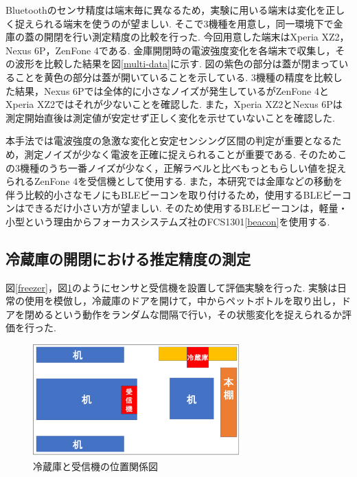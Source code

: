 \documentclass[Japanese]{dicomopapers}
\begin{document}
Bluetoothのセンサ精度は端末毎に異なるため，実験に用いる端末は変化を正しく捉えられる端末を使うのが望ましい.
そこで3機種を用意し，同一環境下で金庫の蓋の開閉を行い測定精度の比較を行った.
今回用意した端末はXperia XZ2，Nexus 6P，ZenFone 4である.
金庫開閉時の電波強度変化を各端末で収集し，その波形を比較した結果を図\ref{multi-data}に示す.
図の紫色の部分は蓋が閉まっていることを黄色の部分は蓋が開いていることを示している.
3機種の精度を比較した結果，Nexus 6Pでは全体的に小さなノイズが発生しているがZenFone 4とXperia XZ2ではそれが少ないことを確認した.
また，Xperia XZ2とNexus 6Pは測定開始直後は測定値が安定せず正しく変化を示せていないことを確認した.

本手法では電波強度の急激な変化と安定センシング区間の判定が重要となるため，測定ノイズが少なく電波を正確に捉えられることが重要である.
そのためこの3機種のうち一番ノイズが少なく，正解ラベルと比べもっともらしい値を捉えられるZenFone 4を受信機として使用する.
また，本研究では金庫などの移動を伴う比較的小さなモノにもBLEビーコンを取り付けるため，使用するBLEビーコンはできるだけ小さい方が望ましい.
そのため使用するBLEビーコンは，軽量・小型という理由からフォーカスシステムズ社のFCS1301\ref{beacon}を使用する.


\subsection{冷蔵庫の開閉における推定精度の測定}
図\ref{freezer}，図\ref{refrigerator_position}のようにセンサと受信機を設置して評価実験を行った.
実験は日常の使用を模倣し，冷蔵庫のドアを開けて，中からペットボトルを取り出し，ドアを閉めるという動作をランダムな間隔で行い，その状態変化を捉えられるか評価を行った.
\begin{figure}[h]
    \centering
    \includegraphics[width=8cm]{refrigerator_position.png}
    \caption{冷蔵庫と受信機の位置関係図}
    \label{refrigerator_position}
\end{figure}
\end{document}
